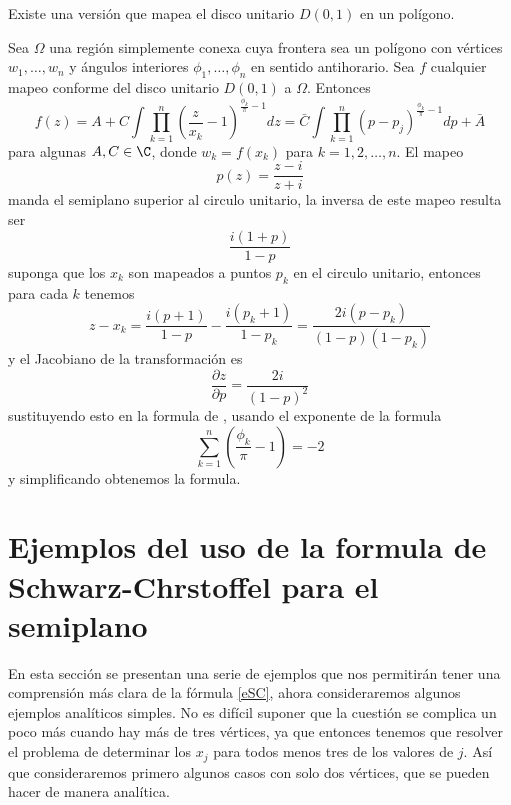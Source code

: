 Existe una versión que mapea el disco unitario $D(0,1)$  en un polígono.
\begin{teor} 
	Sea $\Omega$ una región simplemente conexa cuya frontera sea un polígono con vértices $w_1,\ldots,w_n$ y ángulos interiores $\phi_1, \ldots,\phi_n $ en sentido antihorario. Sea $f$ cualquier mapeo conforme del disco unitario $D(0,1)$ a $\Omega$. Entonces
	\begin{equation}\label{SCD}
		f(z)=A+C\int\prod_{k=1}^{n}\left(\dfrac{z}{x_k}-1\right)^{\frac{\phi_k}{\pi}-1}dz=\bar{C}\int\prod_{k=1}^{n}(p-p_j)^{\frac{\phi_k}{\pi}-1}dp+\bar{A}
	\end{equation}
	para algunas $A,C\in \C$, donde $w_k=f(x_k)$ para $k=1,2,\ldots,n$.
	\proof El mapeo 
	$$p(z)=\dfrac{z-i}{z+i}$$
	manda el semiplano superior al circulo unitario, la inversa de este mapeo resulta ser
	$$\dfrac{i(1+p)}{1-p}$$
	suponga que los $x_k$ son mapeados a puntos $p_k$ en el circulo unitario, entonces para cada $k$ tenemos
	$$z-x_k=\dfrac{i(p+1)}{1-p}-\dfrac{i(p_k+1)}{1-p_k}=\dfrac{2i(p-p_k)}{(1-p)(1-p_k)}$$
	y el Jacobiano de la transformación es 
	$$\dfrac{\partial z}{\partial p}=\dfrac{2i}{(1-p)^2}$$
	sustituyendo esto en la formula de \SC, usando el exponente de la formula 
	$$\sum_{k=1}^{n}\left(\frac{\phi_k}{\pi}-1\right)=-2$$
	y simplificando obtenemos la formula.\endproof
\end{teor}

	
	
\section{Ejemplos del uso de la formula de Schwarz-Chrstoffel para el semiplano}
	En esta sección se presentan una serie de ejemplos que nos permitirán tener una comprensión más clara de la fórmula \ref{eSC}, ahora consideraremos algunos ejemplos analíticos simples. No es difícil suponer que  la cuestión se complica un poco más cuando hay más de tres vértices, ya que entonces tenemos que resolver el problema de determinar los $x_j$ para todos menos tres de los valores de $j$. Así que consideraremos primero algunos casos con solo dos vértices, que se pueden hacer de manera analítica.  
